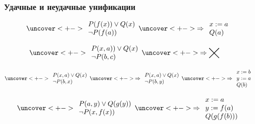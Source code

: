 \documentclass[24pt,pdf,hyperref={unicode},aspectratio=169]{beamer}
\newcommand{\nothing}
{
\begin{minipage}{1cm}
\begin{tikzpicture}[x=0.5cm,y=0.5cm]
\draw[thick] (0,0)--(1,1);
\draw[thick] (0,1)--(1,0);
\end{tikzpicture}
\end{minipage}
}
\begin{document}
\begin{frame}\frametitle{Удачные и неудачные унификации}

$$
\uncover<+->{
\begin{array}{l}
P(f(x))\vee Q(x) \\
\neg P(f(a))
\end{array}
}
\uncover<+->{
\Rightarrow
\begin{array}{l}
x:=a\\
Q(a)
\end{array}
}
$$

$$
\uncover<+->{
\begin{array}{l}
P(x,a))\vee Q(x) \\
\neg P(b,c)
\end{array}
}
\uncover<+->{
\Rightarrow
\nothing
}
$$

$$
\uncover<+->{
\begin{array}{l}
P(x,a)\vee Q(x) \\
\neg P(b,x)
\end{array}
}
\uncover<+->{
\Rightarrow
\begin{array}{l}
P(x,a)\vee Q(x) \\
\neg P(b,y)
\end{array}
}
\uncover<+->{
\Rightarrow
\begin{array}{l}
x:=b\\
y:=a\\
Q(b)\\
\end{array}
}
$$

$$
\uncover<+->{
\begin{array}{l}
P(a,y)\vee Q(g(y)) \\
\neg P(x,f(x))
\end{array}
}
\uncover<+->{
\Rightarrow
\begin{array}{l}
x:=a\\
y:=f(a)\\
Q(g(f(b)))\\
\end{array}
}
$$
\end{frame}
\end{document}
